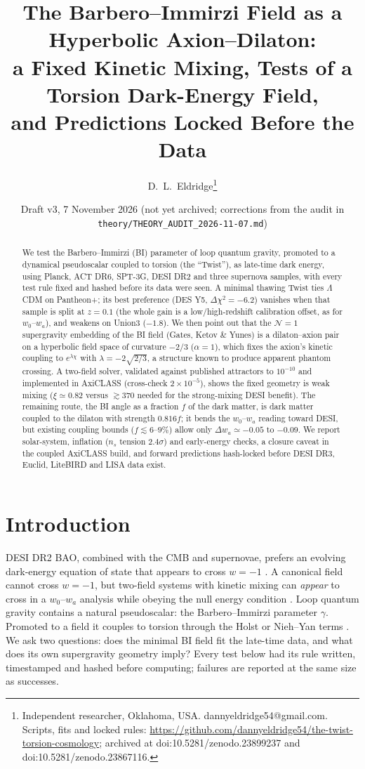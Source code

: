\documentclass[11pt]{article}
\title{\textbf{The Barbero--Immirzi Field as a Hyperbolic Axion--Dilaton:\\
a Fixed Kinetic Mixing, Tests of a Torsion Dark-Energy Field,\\ and Predictions Locked Before the Data}}
\author{D.~L.~Eldridge\thanks{Independent researcher, Oklahoma, USA. dannyeldridge54@gmail.com.
Scripts, fits and locked rules: \url{https://github.com/dannyeldridge54/the-twist-torsion-cosmology};
archived at doi:10.5281/zenodo.23899237 and doi:10.5281/zenodo.23867116.}}
\date{Draft v3, 7 November 2026 (not yet archived; corrections from the audit in \texttt{theory/THEORY\_AUDIT\_2026-11-07.md})}
\begin{document}
\sloppy
\maketitle

\begin{abstract}
We test the Barbero--Immirzi (BI) parameter of loop quantum gravity, promoted to a dynamical pseudoscalar coupled to
torsion (the ``Twist''), as late-time dark energy, using Planck, ACT DR6, SPT-3G, DESI DR2 and three supernova
samples, with every test rule fixed and hashed before its data were seen. A minimal thawing Twist ties $\Lambda$CDM
on Pantheon+; its best preference (DES Y5, $\Delta\chi^2=-6.2$) vanishes when that sample is split at $z=0.1$ (the
whole gain is a low/high-redshift calibration offset, as for $w_0$--$w_a$), and weakens on Union3 ($-1.8$). We then
point out that the $\mathcal N=1$ supergravity embedding of the BI field (Gates, Ketov \& Yunes) is a dilaton--axion
pair on a hyperbolic field space of curvature $-2/3$ ($\alpha=1$), which fixes the axion's kinetic coupling to
$e^{\lambda\chi}$ with $\lambda=-2\sqrt{2/3}$, a structure known to produce apparent phantom crossing. A two-field solver,
validated against published attractors to $10^{-10}$ and implemented in AxiCLASS (cross-check $2\times10^{-5}$), shows
the fixed geometry is weak mixing ($\xi\simeq0.82$ versus $\gtrsim370$ needed for the strong-mixing DESI benefit). The
remaining route, the BI angle as a fraction $f$ of the dark matter, is dark matter coupled to the dilaton with strength
$0.816f$; it bends the $w_0$--$w_a$ reading toward DESI, but existing coupling bounds ($f\lesssim6$--$9\%$) allow only
$\Delta w_a\simeq-0.05$ to $-0.09$. We report solar-system, inflation ($n_s$ tension $2.4\sigma$) and early-energy
checks, a closure caveat in the coupled AxiCLASS build, and forward predictions hash-locked before DESI DR3, Euclid,
LiteBIRD and LISA data exist.
\end{abstract}

\section{Introduction}
DESI DR2 BAO, combined with the CMB and supernovae, prefers an evolving dark-energy equation of state that appears to
cross $w=-1$ \cite{desi2025}. A canonical field cannot cross $w=-1$, but two-field systems with kinetic mixing can
\emph{appear} to cross in a $w_0$--$w_a$ analysis while obeying the null energy condition \cite{toomey2025,ramos2026}.
Loop quantum gravity contains a natural pseudoscalar: the Barbero--Immirzi parameter $\gamma$. Promoted to a field it
couples to torsion through the Holst or Nieh--Yan terms \cite{taveras2008,calcagni2009}. We ask two questions:
does the minimal BI field fit the late-time data, and what does its own supergravity geometry imply? Every test below
had its rule written, timestamped and hashed before computing; failures are reported at the same size as successes.
\end{document}
